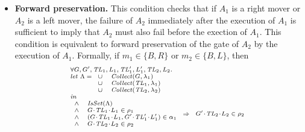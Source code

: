 \begin{itemize}
\item {\bf Forward preservation.}
This condition checks that if $A_1$ is a right mover or $A_2$ is a left mover,
the failure of $A_2$ immediately after the execution of $A_1$ is sufficient to imply 
that $A_2$ must also fail before the exection of $A_1$.
This condition is equivalent to forward preservation of the gate of $A_2$ by the execution of $A_1$.
Formally, if $m_1 \in \{B,R\}$ or $m_2 \in \{B,L\}$, then 
\[
\scriptsize{
\begin{array}{l}
\forall \varsG,\varsG',\varsTL_1,\varsL_1,\varsTL'_1,\varsL'_1,\varsTL_2,\varsL_2. \\
\mathit{let}\ \Lambda =
\begin{array}[t]{ll}
\cup & \Collect(\varsG, \lins_1) \\
\cup & \Collect(\varsTL_1, \lins_1) \\
\cup & \Collect(\varsTL_2, \lins_2) 
\end{array} \\
\mathit{in} \\
\begin{array}{ll}
\wedge & \IsSet(\Lambda) \\
\wedge & \MakeStore{\varsG}{\varsTL_1}{\varsL_1} \in \rho_1 \\
\wedge & (\MakeStore{\varsG}{\varsTL_1}{\varsL_1},\MakeStore{\varsG'}{\varsTL'_1}{\varsL'_1}) \in \alpha_1 \\
\wedge & \MakeStore{\varsG}{\varsTL_2}{\varsL_2} \in \rho_2 \\
\end{array} 
\Rightarrow 
\begin{array}{l}
\MakeStore{\varsG'}{\varsTL_2}{\varsL_2} \in \rho_2 
\end{array}
\end{array}
}
\]


\end{itemize}
